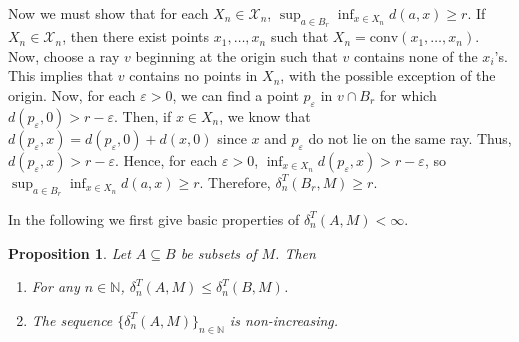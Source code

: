 \documentclass{bcp92}
\theoremstyle{plain}
\newtheorem{pro}[thm]{Proposition}
\theoremstyle{definition}
\begin{document}
Now we must show that for each $X_n \in \mathcal{X}_n$, $\sup_{a \in B_r}
\inf_{x \in X_n} d(a,x) \geq r$. If $X_n \in \mathcal{X}_n$, then there exist
points $x_1, \dots, x_{n}$ such that $X_n = \text{conv}(x_1, \dots, x_{n})$.
Now, choose a ray $v$ beginning at the origin such that $v$ contains none of
the $x_i$'s. This implies that $v$ contains no points in $X_n$, with the
possible exception of the origin. Now, for each $\varepsilon > 0$, we can
find a point $p_{\varepsilon}$ in $v \cap B_r$ for which
$d(p_{\varepsilon},0) > r - \varepsilon$. Then, if $x \in X_n$, we know that
$d(p_{\varepsilon}, x) = d(p_{\varepsilon},0) + d(x,0)$ since $x$ and
$p_{\varepsilon}$ do not lie on the same ray. Thus, $d(p_{\varepsilon}, x) >
r - \varepsilon$. Hence, for each $\varepsilon > 0$, $\inf_{x \in X_n}
d(p_{\varepsilon}, x) > r - \varepsilon$, so $\sup_{a \in B_r} \inf_{x \in
X_n} d(a,x) \geq r$. Therefore, $\delta_n^T(B_r,M) \geq r$.

In the following we first give basic properties of $\delta_n^T(A,M) < \infty$.

\begin{pro} \label{noninc}
Let $A \subseteq B$ be subsets of $M$. Then
\begin{enumerate}
\item For any $n \in \mathbb{N}$, $\delta_n^T(A,M) \leq \delta_n^T(B,M)$.
\item The sequence $\{ \delta_n^T(A,M) \}_{n \in \mathbb{N}}$ is
non-increasing.
\end{enumerate}
\end{pro}
\end{document}
